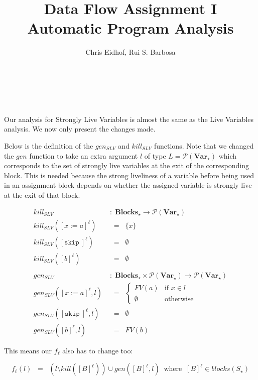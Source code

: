 \documentclass[a4wide,12pt]{article}
\def\eq{\;\; = \;\;}
\def\pset#1{\mathcal{P}(#1)}
\def\Blocks{\mathbf{Blocks}}
\def\Var {\mathbf{Var}}
\def\skip {\texttt{skip}\ }
\begin{document}
\author{Chris Eidhof, Rui S. Barbosa}
\title{Data Flow Assignment I \\ Automatic Program Analysis}
 
\maketitle

\section{~}
 
Our analysis for Strongly Live Variables is almost the same as the Live
Variables analysis. We now only present the changes made.

Below is the definition of the $gen_{SLV}$ and $kill_{SLV}$ functions.
Note that we changed the $gen$ function to take an
extra argument $l$ of type $L = \pset{\Var_\star}$ which
corresponds to the set of strongly live variables at the exit of the corresponding block.
This is needed because the strong liveliness of a variable before
being used in an assignment block
depends on whether the assigned variable is strongly live at the exit of that block.
 
\begin{align*}
kill_{SLV} & \; : \; \Blocks_\star \to \pset{\Var_\star} \\
kill_{SLV}([x:=a]^\ell) & \eq \{x\} \\
kill_{SLV}([\skip]^\ell) & \eq \emptyset\\
kill_{SLV}([b]^\ell) & \eq \emptyset \\
\\
gen_{SLV} & \; : \; \Blocks_\star \times \pset{\Var_\star} \to \pset{\Var_\star} \\
gen_{SLV}([x:=a]^\ell,l) & \eq
         \begin{cases}
          FV(a) & \text{if $x \in l$} \\
          \emptyset & \text{otherwise}
         \end{cases} \\
gen_{SLV}([\skip]^\ell,l) & \eq \emptyset\\
gen_{SLV}([b]^\ell,l) & \eq FV(b)
\end{align*}
 
This means our $f_\ell$ also has to change too:
 
\[ f_\ell(l) \eq (l \setminus kill([B]^\ell)) \cup gen([B]^\ell, l) \;\; \text{where} \;\; [B]^\ell
\in blocks(S_\star)
\]
 
\end{document}
